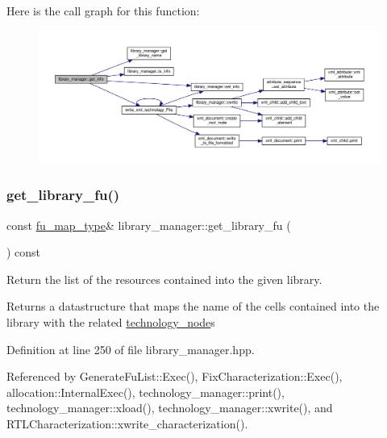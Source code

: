 Here is the call graph for this function\+:
\nopagebreak
\begin{figure}[H]
\begin{center}
\leavevmode
\includegraphics[width=350pt]{d8/d35/classlibrary__manager_a61e98740a159d328dc986c4729844162_cgraph}
\end{center}
\end{figure}
\mbox{\label{classlibrary__manager_a5e6cca29a6c2e2f96563c059371cd79e}} 
\subsubsection{\texorpdfstring{get\+\_\+library\+\_\+fu()}{get\_library\_fu()}}
{\footnotesize\ttfamily const \hyperlink{classlibrary__manager_a17941addb97906d7b41c5b0b0317fde2}{fu\+\_\+map\+\_\+type}\& library\+\_\+manager\+::get\+\_\+library\+\_\+fu (\begin{DoxyParamCaption}{ }\end{DoxyParamCaption}) const\hspace{0.3cm}{\ttfamily [inline]}}



Return the list of the resources contained into the given library. 

\begin{DoxyReturn}{Returns}
a datastructure that maps the name of the cells contained into the library with the related \hyperlink{structtechnology__node}{technology\+\_\+node}\textquotesingle{}s 
\end{DoxyReturn}


Definition at line 250 of file library\+\_\+manager.\+hpp.



Referenced by Generate\+Fu\+List\+::\+Exec(), Fix\+Characterization\+::\+Exec(), allocation\+::\+Internal\+Exec(), technology\+\_\+manager\+::print(), technology\+\_\+manager\+::xload(), technology\+\_\+manager\+::xwrite(), and R\+T\+L\+Characterization\+::xwrite\+\_\+characterization().

